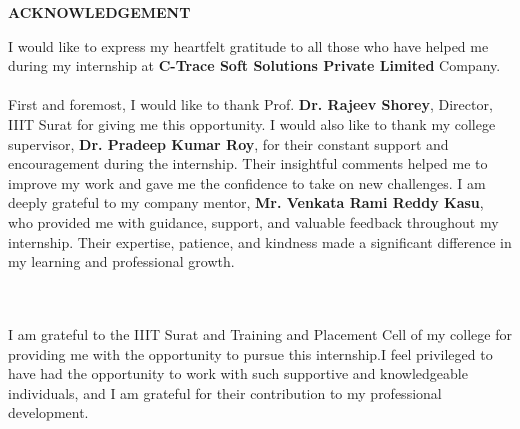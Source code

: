 \thispagestyle{plain}

\begin{center}
 \Large {\bf \uppercase{Acknowledgement}}
\end{center}

\vspace{3\baselineskip}

\justify
I would like to express my heartfelt gratitude to all those who have helped me during my internship at \textbf{C-Trace Soft Solutions Private Limited} Company.
\\ \\
First and foremost, I would like to thank Prof. \textbf{Dr. Rajeev Shorey}, Director, IIIT Surat for giving me this opportunity.
I would also like to thank my college supervisor, \textbf{Dr. Pradeep Kumar Roy}, for their constant support and encouragement during the internship.
Their insightful comments helped me to improve my work and gave me the confidence to take on new challenges.
I am deeply grateful to my company mentor,\textbf{ Mr. Venkata Rami Reddy Kasu}, who provided me with guidance, support, and valuable feedback throughout my internship.
Their expertise, patience, and kindness made a significant difference in my learning and professional growth.

\justify
\\ \\
I am grateful to the IIIT Surat and Training and Placement Cell of my college for providing me with the opportunity to pursue this internship.I feel privileged to have had the opportunity to work with such supportive and knowledgeable individuals, and I am grateful for their contribution to my professional development.


 
